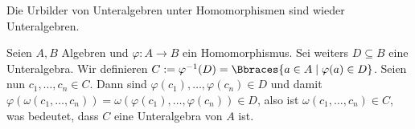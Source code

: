 \begin{exercise}
    Die Urbilder von Unteralgebren unter Homomorphismen sind wieder Unteralgebren.
\end{exercise}

\begin{solution}
    Seien $A,B$ Algebren und $\varphi: A \to B$ ein Homomorphismus. Sei weiters $D \subseteq B$ eine Unteralgebra. Wir definieren $C := \varphi^{-1}(D) = \Bbraces{a \in A \mid \varphi(a) \in D}$. Seien nun $c_1, \dots, c_n \in C$. Dann sind $\varphi(c_1), \dots, \varphi(c_n) \in D$ und damit $\varphi(\omega(c_1, \dots, c_n)) = \omega(\varphi(c_1), \dots, \varphi(c_n)) \in D$, also ist $\omega(c_1, \dots, c_n) \in C$, was bedeutet, dass $C$ eine Unteralgebra von $A$ ist.   
\end{solution}